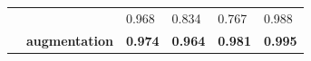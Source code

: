 \documentclass[\ifafour a4paper,12pt,\else a5paper,10pt,\fi%
onecolumn,oneside,article,%
british%
]{memoir}
\theoremstyle{remark}
\theoremstyle{innote}
\renewcommand*{\|}[1][]{\nonscript\:#1\vert\nonscript\:\mathopen{}}
\newcommand*{\sumatrix}[4]{\begin{bsmallmatrix*}[r]#1&#2\\#3&#4\end{bsmallmatrix*}}
\begin{document}
\begin{table}[!p]
%
  \begin{tabular*}{\linewidth}{clw{c}{0.12\linewidth}w{c}{0.12\linewidth}w{c}{0.12\linewidth}w{c}{0.12\linewidth}}

 &\parbox{0.21\linewidth}{\color{myred}}
 &\textcolor{myred}{0.968}
 &\textcolor{myred}{0.834}
 &\textcolor{myred}{0.767}
 &\textcolor{myred}{0.988}
 \\[1\jot]
 &\parbox{0.21\linewidth}{\color{mypurpleblue}\bfseries augmentation}
 &\textcolor{mypurpleblue}{\bfseries 0.974}
 &\textcolor{mypurpleblue}{\bfseries 0.964}
 &\textcolor{mypurpleblue}{\bfseries 0.981}
 &\textcolor{mypurpleblue}{\bfseries 0.995}
 \\[5\jot]

\end{tabular*}
\end{table}
\end{document}
